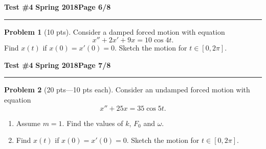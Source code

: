 \documentclass[12pt]{article}
\theoremstyle{definition}
\newtheorem{problem}{Problem}
\begin{document}
\hfill{\large\bf Test \#4}\hfill{\large\bf
  Spring 2018}\hfill{\large\bf Page 6/8}\hrule

\bigskip
\begin{problem}[10 pts]
Consider a damped forced motion with equation 
\begin{equation*}
x'' + 2x' + 9x = 10\cos 4t.
\end{equation*}
Find $x(t)$ if $x(0)=x'(0)=0$.  Sketch the motion for $t \in [0,2\pi]$.
  \vspace{18cm}
  \begin{flushright}
  \end{flushright}
\end{problem}
\newpage

\hfill{\large\bf Test \#4}\hfill{\large\bf
  Spring 2018}\hfill{\large\bf Page 7/8}\hrule

\bigskip
\begin{problem}[20 pts---10 pts each]
Consider an undamped forced motion with equation 
\begin{equation*}
x''+25x=35\cos 5t.
\end{equation*}
\begin{enumerate}
  \item Assume $m=1$.  Find the values of $k$, $F_0$ and $\omega$.
  \begin{flushright}
  \end{flushright}
  \item Find $x(t)$ if $x(0)=x'(0)=0$.  Sketch the motion for $t \in [0,2\pi]$.
  \vspace{16cm}
  \begin{flushright}
  \end{flushright}
\end{enumerate}
\end{problem}
\newpage
\end{document}
